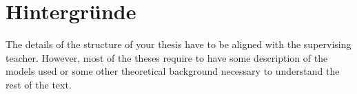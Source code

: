 \chapter{Hintergründe}\label{cha:theoretical-background}
The details of the structure of your thesis have to be aligned with the supervising teacher. However, most of the theses require to have some description of the models used or some other theoretical background necessary to understand the rest of the text.